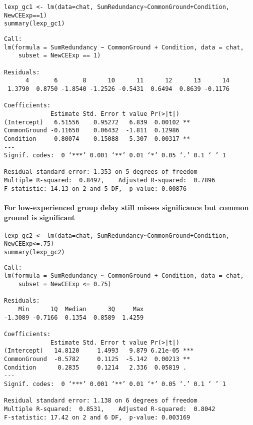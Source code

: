 \documentclass[10pt]{article}
\begin{document}
\begin{verbatim}
lexp_gc1 <- lm(data=chat, SumRedundancy~CommonGround+Condition, NewCEExp==1)
summary(lexp_gc1)
\end{verbatim}

\begin{verbatim}
Call:
lm(formula = SumRedundancy ~ CommonGround + Condition, data = chat, 
    subset = NewCEExp == 1)

Residuals:
      4       6       8      10      11      12      13      14 
 1.3790  0.8750 -1.8540 -1.2526 -0.5431  0.6494  0.8639 -0.1176 

Coefficients:
             Estimate Std. Error t value Pr(>|t|)   
(Intercept)   6.51556    0.95272   6.839  0.00102 **
CommonGround -0.11650    0.06432  -1.811  0.12986   
Condition     0.80074    0.15088   5.307  0.00317 **
---
Signif. codes:  0 ‘***’ 0.001 ‘**’ 0.01 ‘*’ 0.05 ‘.’ 0.1 ‘ ’ 1

Residual standard error: 1.353 on 5 degrees of freedom
Multiple R-squared:  0.8497,	Adjusted R-squared:  0.7896 
F-statistic: 14.13 on 2 and 5 DF,  p-value: 0.00876
\end{verbatim}


\paragraph*{For low-experienced group delay still misses significance but common ground is significant}
\label{sec-2-4-3-6}

\begin{verbatim}
lexp_gc2 <- lm(data=chat, SumRedundancy~CommonGround+Condition, NewCEExp<=.75)
summary(lexp_gc2)
\end{verbatim}

\begin{verbatim}
Call:
lm(formula = SumRedundancy ~ CommonGround + Condition, data = chat, 
    subset = NewCEExp <= 0.75)

Residuals:
    Min      1Q  Median      3Q     Max 
-1.3089 -0.7166  0.1354  0.8589  1.4259 

Coefficients:
             Estimate Std. Error t value Pr(>|t|)    
(Intercept)   14.8120     1.4993   9.879 6.21e-05 ***
CommonGround  -0.5782     0.1125  -5.142  0.00213 ** 
Condition      0.2835     0.1214   2.336  0.05819 .  
---
Signif. codes:  0 ‘***’ 0.001 ‘**’ 0.01 ‘*’ 0.05 ‘.’ 0.1 ‘ ’ 1

Residual standard error: 1.138 on 6 degrees of freedom
Multiple R-squared:  0.8531,	Adjusted R-squared:  0.8042 
F-statistic: 17.42 on 2 and 6 DF,  p-value: 0.003169
\end{verbatim}
\end{document}
